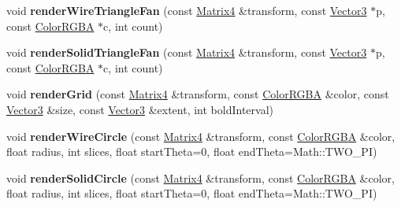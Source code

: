 \begin{DoxyCompactItemize}
\item 
void {\bfseries render\+Wire\+Triangle\+Fan} (const \hyperlink{class_i_dream_sky_1_1_matrix4}{Matrix4} \&transform, const \hyperlink{class_i_dream_sky_1_1_vector3}{Vector3} $\ast$p, const \hyperlink{class_i_dream_sky_1_1_color_r_g_b_a}{Color\+R\+G\+BA} $\ast$c, int count)\hypertarget{class_i_dream_sky_1_1_i_component_debug_renderer_abcf64331eca38d235196c7b89dca0844}{}\label{class_i_dream_sky_1_1_i_component_debug_renderer_abcf64331eca38d235196c7b89dca0844}

\item 
void {\bfseries render\+Solid\+Triangle\+Fan} (const \hyperlink{class_i_dream_sky_1_1_matrix4}{Matrix4} \&transform, const \hyperlink{class_i_dream_sky_1_1_vector3}{Vector3} $\ast$p, const \hyperlink{class_i_dream_sky_1_1_color_r_g_b_a}{Color\+R\+G\+BA} $\ast$c, int count)\hypertarget{class_i_dream_sky_1_1_i_component_debug_renderer_a150fadcffa44ab9dad111073e82dae63}{}\label{class_i_dream_sky_1_1_i_component_debug_renderer_a150fadcffa44ab9dad111073e82dae63}

\item 
void {\bfseries render\+Grid} (const \hyperlink{class_i_dream_sky_1_1_matrix4}{Matrix4} \&transform, const \hyperlink{class_i_dream_sky_1_1_color_r_g_b_a}{Color\+R\+G\+BA} \&color, const \hyperlink{class_i_dream_sky_1_1_vector3}{Vector3} \&size, const \hyperlink{class_i_dream_sky_1_1_vector3}{Vector3} \&extent, int bold\+Interval)\hypertarget{class_i_dream_sky_1_1_i_component_debug_renderer_a3e96142f397cce0056193e67acb0328d}{}\label{class_i_dream_sky_1_1_i_component_debug_renderer_a3e96142f397cce0056193e67acb0328d}

\item 
void {\bfseries render\+Wire\+Circle} (const \hyperlink{class_i_dream_sky_1_1_matrix4}{Matrix4} \&transform, const \hyperlink{class_i_dream_sky_1_1_color_r_g_b_a}{Color\+R\+G\+BA} \&color, float radius, int slices, float start\+Theta=0, float end\+Theta=Math\+::\+T\+W\+O\+\_\+\+PI)\hypertarget{class_i_dream_sky_1_1_i_component_debug_renderer_ac6e55cbf2859be9ff89404eeb5631951}{}\label{class_i_dream_sky_1_1_i_component_debug_renderer_ac6e55cbf2859be9ff89404eeb5631951}

\item 
void {\bfseries render\+Solid\+Circle} (const \hyperlink{class_i_dream_sky_1_1_matrix4}{Matrix4} \&transform, const \hyperlink{class_i_dream_sky_1_1_color_r_g_b_a}{Color\+R\+G\+BA} \&color, float radius, int slices, float start\+Theta=0, float end\+Theta=Math\+::\+T\+W\+O\+\_\+\+PI)\hypertarget{class_i_dream_sky_1_1_i_component_debug_renderer_a3731cc6906c1658e2fdc62273d390e61}{}\label{class_i_dream_sky_1_1_i_component_debug_renderer_a3731cc6906c1658e2fdc62273d390e61}


\end{DoxyCompactItemize}
